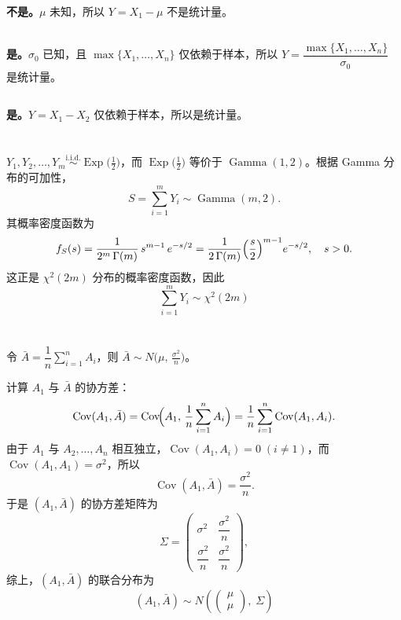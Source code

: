 \documentclass[12pt,a4paper]{article}
\newcommand{\Cov}{\operatorname{Cov}}
\newcommand{\Exp}{\operatorname{Exp}}
\newcommand{\Ga}{\operatorname{Gamma}}
\newcommand{\ii}{\mathrm{i.i.d.}}
\begin{document}
\textbf{不是。}$\mu$ 未知，所以 $Y=X_{1}-\mu$ 不是统计量。

\subsection{}

\textbf{是。}$\sigma_{0}$ 已知，且 $\max\{X_{1},\ldots,X_{n}\}$ 仅依赖于样本，所以 $Y=\dfrac{\max\{X_{1},\ldots,X_{n}\}}{\sigma_{0}}$ 是统计量。

\subsection{}

\textbf{是。}$Y=X_{1}-X_{2}$ 仅依赖于样本，所以是统计量。

\section{}

$Y_{1},Y_{2},\ldots,Y_{m}\overset{\ii}{\sim}\Exp\!\bigl(\tfrac{1}{2}\bigr)$，而 $\Exp\!\bigl(\tfrac{1}{2}\bigr)$ 等价于 $\Ga(1,2)$。根据 Gamma 分布的可加性，
\[
  S=\sum_{i=1}^{m}Y_{i}\sim\Ga(m,2).
\]
其概率密度函数为
\[
  f_{S}(s)
  =\frac{1}{2^{m}\,\Gamma(m)}\,s^{m-1}\,e^{-s/2}
  =\frac{1}{2\,\Gamma(m)}\Bigl(\frac{s}{2}\Bigr)^{m-1}e^{-s/2},\quad s>0.
\]
这正是 $\chi^{2}(2m)$ 分布的概率密度函数，因此
\[
  \boxed{\sum_{i=1}^{m}Y_{i}\sim\chi^{2}(2m)}
\]

\section{}

\subsection{}

令 $\bar{A}=\dfrac{1}{n}\sum_{i=1}^{n}A_{i}$，则 $\bar{A}\sim N\!\bigl(\mu,\,\tfrac{\sigma^{2}}{n}\bigr)$。

计算 $A_{1}$ 与 $\bar{A}$ 的协方差：
\[
  \Cov(A_{1},\bar{A})
  =\Cov\!\Bigl(A_{1},\,\frac{1}{n}\sum_{i=1}^{n}A_{i}\Bigr)
  =\frac{1}{n}\sum_{i=1}^{n}\Cov(A_{1},A_{i}).
\]
由于 $A_{1}$ 与 $A_{2},\ldots,A_{n}$ 相互独立，$\Cov(A_{1},A_{i})=0\;(i\neq1)$，而 $\Cov(A_{1},A_{1})=\sigma^{2}$，所以
\[
  \Cov(A_{1},\bar{A})=\frac{\sigma^{2}}{n}.
\]
于是 $(A_{1},\bar{A})$ 的协方差矩阵为
\[
  \Sigma=\begin{pmatrix}
    \sigma^{2}            & \dfrac{\sigma^{2}}{n}\\[6pt]
    \dfrac{\sigma^{2}}{n} & \dfrac{\sigma^{2}}{n}
  \end{pmatrix},
\]
综上，$(A_{1},\bar{A})$ 的联合分布为
\[
  \boxed{(A_{1},\bar{A})\sim N\!\left(
    \begin{pmatrix}\mu\\\mu\end{pmatrix},\;\Sigma
  \right)}
\]
\end{document}
